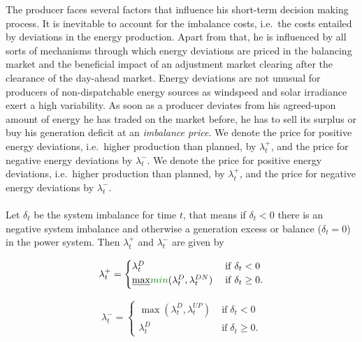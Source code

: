 The producer faces several factors that influence his short-term decision making process. It is inevitable to account for the imbalance costs, i.e.\ the costs entailed by deviations in the energy production. Apart from that, he is influenced by all sorts of mechanisms through which energy deviations are priced in the balancing market and the beneficial impact of an adjustment market clearing after the clearance of the day-ahead market. Energy deviations are not unusual for producers of non-dispatchable energy sources as windspeed and solar irradiance exert a high variability. As soon as a producer deviates from his agreed-upon amount of energy he has traded on the market before, he has to sell its surplus or buy his generation deficit at an \textit{imbalance price}. We denote the price for positive energy deviations, i.e.\ higher production than planned, by $\lambda_{t}^{+}$, and the price for negative energy deviations by $\lambda_{t}^{-}$. 
We denote the price for positive energy deviations, i.e.\ higher production than planned, by $\lambda_{t}^{+}$, and the price for negative energy deviations by $\lambda_{t}^{-}$.
\\ \\
Let $\delta_t$ be the system imbalance for time $t$, that means if $\delta_t<0$ there is an negative system imbalance and otherwise a generation excess or balance ($\delta_t=0$) in the power system. Then $\lambda_t^+$ and $\lambda_t^-$ are given by 
\begin{figure}[h!]
	\begin{minipage}{0.5\textwidth}
		\begin{equation*}
			\lambda_{t}^+=\begin{cases}
				\lambda_{t}^D &\mathrm{\; if \;} \delta_{t}<0
				\\ \sout{\max}\changedByLP{min}(\lambda_t^D,\lambda_t^{DN}) &\mathrm{\; if \;} \delta_{t}\ge 0.
			\end{cases}
		\end{equation*}
	\end{minipage}
	\hfill
	\begin{minipage}{0.5\textwidth}
		\begin{equation*}
			\lambda_t^-=\begin{cases}
				\max(\lambda_t^D,\lambda_t^{UP}) &\mathrm{\; if \;} \delta_{t}<0
				\\ \lambda_{t}^{D} &\mathrm{\; if \;} \delta_{t}\ge 0.
			\end{cases}
		\end{equation*}
	\end{minipage}
\end{figure}

